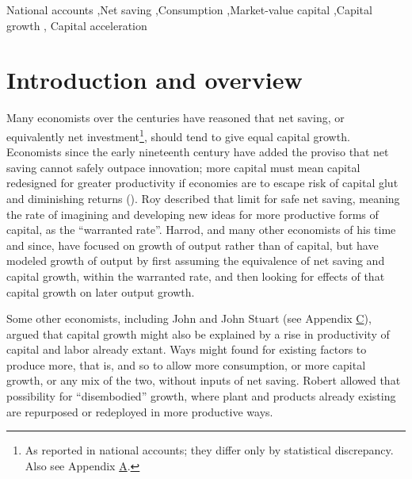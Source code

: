 \documentclass[a4paper,fleqn]{latex_styles/cas-sc}
\begin{document}

\begin{keywords}
National accounts \sep Net
saving \sep Consumption \sep Market-value capital \sep Capital
growth \sep 
Capital acceleration

\end{keywords}

\maketitle

\hypertarget{introduction}{%
\section{Introduction and overview}\label{introduction}}

Many economists over the centuries have reasoned that net saving, or equivalently net investment\footnote{As reported in national accounts; they differ only by statistical discrepancy. Also see Appendix \hyperref[appendix-a]{A}.}, should tend to give equal capital growth. Economists since the early
nineteenth century have added the proviso that net saving cannot
safely outpace innovation; more capital must mean capital redesigned for
greater productivity if economies are to escape risk of capital glut and
diminishing returns
(\citet{westEssayApplicationCapital1815, ricardoEssayProfitsVol1815, malthusEnquiryNatureProgress1815}).
Roy \citet{harrodEssayDynamicTheory1939}
described that limit for safe net saving, meaning the rate of
imagining and developing new ideas for more productive forms of capital,
as the ``warranted rate''. Harrod, and many other economists of his time
and since, have focused on growth of output rather than of capital, but
have modeled growth of output by first assuming the equivalence of net
saving and capital growth, within the warranted rate, and then
looking for effects of that capital growth on later output growth.

Some other economists, including John  \citet{raeNewPrinciplesPolitical1834} and John Stuart 
\citet{millPrinciplesPoliticalEconomy1848} (see Appendix \hyperref[appendix-c]{C}), argued that capital growth might also be explained
by a rise in productivity of capital and labor already extant. Ways
might found for existing factors to produce more, that is, and so to
allow more consumption, or more capital growth, or any mix of the two,
without inputs of net saving. Robert
\citet{solowTECHNICALCHANGEAGGREGATE1957} allowed that possibility for
``disembodied'' growth, where plant and products already existing are
repurposed or redeployed in more productive ways.
\end{document}
